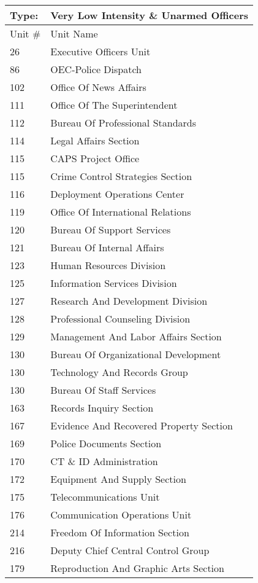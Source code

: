 \begin{table}
\tiny
\centering
\caption{}\label{tab:desk}
\begin{tabular}{|ll|}
\hline
Type: &	\textbf{Very Low Intensity \& Unarmed Officers} \\
\hline
Unit \# &	Unit Name \\
\hline
26	&Executive Officers Unit\\
86	&OEC-Police Dispatch\\
102	&Office Of News Affairs\\
111	&Office Of The Superintendent\\
112	&Bureau Of Professional Standards\\
114	&Legal Affairs Section\\
115	&CAPS Project Office\\
115	&Crime Control Strategies Section\\
116	&Deployment Operations Center\\
119	&Office Of International Relations\\
120	&Bureau Of Support Services\\
121	&Bureau Of Internal Affairs\\
123	&Human Resources Division\\
125	&Information Services Division\\
127	&Research And Development Division\\
128	&Professional Counseling Division\\
129	&Management And Labor Affairs Section\\
130	&Bureau Of Organizational Development\\
130	&Technology And Records Group\\
130	&Bureau Of Staff Services\\
163	&Records Inquiry Section\\
167	&Evidence And Recovered Property Section\\
169	&Police Documents Section\\
170	&CT \& ID Administration\\
172	&Equipment And Supply Section\\
175	&Telecommunications Unit\\
176	&Communication Operations Unit\\
214	&Freedom Of Information Section\\
216	&Deputy Chief Central Control Group\\
179	&Reproduction And Graphic Arts Section\\

\end{tabular}
\end{table}
